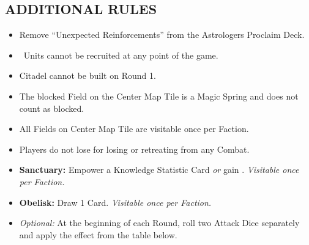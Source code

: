 \begin{multicols*}{2}
\subsection*{\MakeUppercase{Additional Rules}}
\begin{itemize}
  \item Remove ``Unexpected Reinforcements'' from the Astrologers Proclaim Deck.
  \item \azure\ Units cannot be recruited at any point of the game.
  \item Citadel cannot be built on Round 1.
  \item The blocked Field on the Center Map Tile is a Magic Spring and does not count as blocked.
  \item All Fields on Center Map Tile are visitable once per Faction.
  \item Players do not lose  for losing or retreating from any Combat.
  \item \textbf{Sanctuary:} Empower a Knowledge Statistic Card \textit{or} gain . \textit{Visitable once per Faction.}
  \item \textbf{Obelisk:} Draw 1 Card. \textit{Visitable once per Faction.}
  \item \textit{Optional:} At the beginning of each Round, roll two Attack Dice separately and apply the effect from the table below.
\end{itemize}

\end{multicols*}
